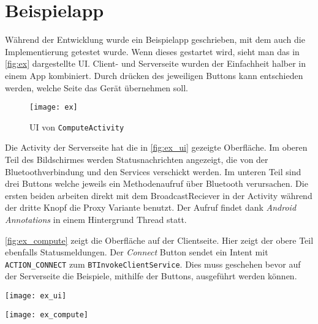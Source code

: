 \chapter{Beispielapp}\label{chap:example}
%
Während der Entwicklung wurde ein Beispielapp geschrieben, mit dem auch die Implementierung getestet wurde. Wenn dieses gestartet wird, sieht man das in \autoref{fig:ex} dargestellte UI. Client- und Serverseite wurden der Einfachheit halber in einem App kombiniert. Durch drücken des jeweiligen Buttons kann entschieden werden, welche Seite das Gerät übernehmen soll.
\begin{figure}[htbp]
  \centering
  \texttt{[image: ex]}
  \caption{UI von \lstinline{ComputeActivity}}
  \label{fig:ex}
\end{figure}

Die Activity der Serverseite hat die in \autoref{fig:ex_ui} gezeigte Oberfläche. Im oberen Teil des Bildschirmes werden Statusnachrichten angezeigt, die von der Bluetoothverbindung und den Services verschickt werden. Im unteren Teil sind drei Buttons welche jeweils ein Methodenaufruf über Bluetooth verursachen. Die ersten beiden arbeiten direkt mit dem BroadcastReciever in der Activity während der dritte Knopf die Proxy Variante benutzt. Der Aufruf findet dank \emph{Android Annotations} in einem Hintergrund Thread statt.

\autoref{fig:ex_compute} zeigt die Oberfläche auf der Clientseite. Hier zeigt der obere Teil ebenfalls Statusmeldungen. Der \emph{Connect} Button sendet ein Intent mit \lstinline{ACTION_CONNECT} zum \lstinline{BTInvokeClientService}. Dies muss geschehen bevor auf der Serverseite die Beispiele, mithilfe der Buttons, ausgeführt werden können.
%

\begin{minipage}{.5\textwidth}
    \centering
    \texttt{[image: ex\_ui]}
    \label{fig:ex_ui}
\end{minipage}
\begin{minipage}{.5\textwidth}
    \centering
    \texttt{[image: ex\_compute]}
    \label{fig:ex_compute}
\end{minipage}
%
